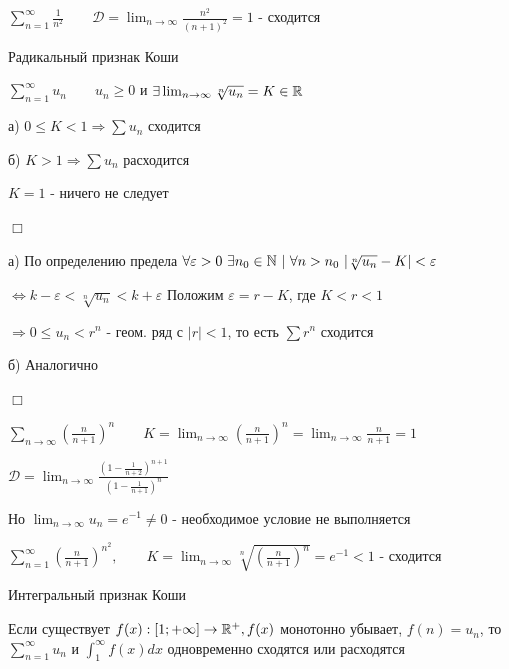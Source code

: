 \documentclass[12pt]{article}
\begin{document}
    $\sum_{n = 1}^\infty \frac{1}{n^2} \quad\quad \mathcal{D} = \lim_{n \to \infty} \frac{n^2}{(n + 1)^2} = 1$ - сходится

    \begin{MyTheorem}
         Радикальный признак Коши

        $\sum_{n = 1}^\infty u_n \quad\quad u_n \geq 0$ и $\exists \lim_{n \to \infty} \sqrt[n]{u_n} = K \in \mathbb{R}$

        а) $0 \leq K < 1 \Longrightarrow \sum u_n$ сходится

        б) $K > 1 \Longrightarrow \sum u_n$ расходится
    \end{MyTheorem}

    \Notas $K = 1$ - ничего не следует

    \begin{MyProof}
        $\Box$

        а) По определению предела $\forall \varepsilon > 0 \ \exists n_0 \in \Natural \ | \ \forall n > n_0 \ |\sqrt[n]{u_n} - K| < \varepsilon$

        $\Longleftrightarrow k - \varepsilon < \sqrt[n]{u_n} < k + \varepsilon$ Положим $\varepsilon = r - K$, где $K < r < 1$

        $\Longrightarrow 0 \leq u_n < r^n$ - геом. ряд с $|r| < 1$, то есть $\sum r^n$ сходится

        б) Аналогично

        $\Box$
    \end{MyProof}

     $\sum_{n \to \infty} \left(\frac{n}{n + 1}\right)^n \quad\quad K = \lim_{n \to \infty} \left(\frac{n}{n + 1}\right)^n = \lim_{n \to \infty} \frac{n}{n + 1} = 1$

    $\mathcal{D} = \lim_{n \to \infty} \frac{\left(1 - \frac{1}{n + 2}\right)^{n + 1}}{\left(1 - \frac{1}{n + 1}\right)^{n}}$

    Но $\lim_{n \to \infty} u_n = e^{-1} \neq 0$ - необходимое условие не выполняется

     $\sum_{n = 1}^\infty \left(\frac{n}{n + 1}\right)^{n^2}, \quad\quad K = \lim_{n \to \infty} \sqrt[n]{\left(\frac{n}{n + 1}\right)^n} = e^{-1} < 1$ - сходится

    \begin{MyTheorem}
         Интегральный признак Коши

        Если существует $f(x) : [1; +\infty] \to \mathbb{R}^+, f(x)$ монотонно убывает, $f(n) = u_n$, то $\sum_{n = 1}^\infty u_n$ и $\int_{1}^\infty f(x) dx$ одновременно сходятся или расходятся
    \end{MyTheorem}
\end{document}
